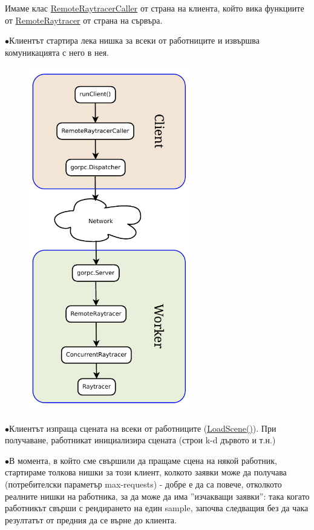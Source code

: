 \documentclass[12pt]{extarticle}
\newlength{\bulletwidth}\settowidth{\bulletwidth}{$\bullet$}
\newcommand{\mitem}{\vspace{5mm}\setlength{\leftskip}{\leftmargin}\hspace*{-\labelsep}\hspace*{-\bulletwidth}$\bullet$\hspace*{\labelsep}}
\begin{document}
Имаме клас \href{https://godoc.org/github.com/DexterLB/traytor/rpc#RemoteRaytracerCaller}{RemoteRaytracerCaller} от страна на клиента, който вика функциите от \href{https://godoc.org/github.com/DexterLB/traytor/rpc#RemoteRaytracer}{RemoteRaytracer} от страна на
сървъра.


	\mitem Клиентът стартира лека нишка за всеки от работниците
	и извършва комуникацията с него в нея.

\begin{figure}
\includegraphics[width=7cm]{architecture.pdf}
\end{figure}
	
	\mitem Клиентът изпраща сцената на всеки от работниците
	(\href{https://godoc.org/github.com/DexterLB/traytor/rpc#RemoteRaytracer.LoadScene}{LoadScene()}). При получаване,
	работникат инициализира сцената (строи k-d дървото и т.н.)
	
	\mitem В момента, в който сме свършили да пращаме сцена на някой
	работник, стартираме толкова нишки за този клиент, колкото заявки
	може да получава (потребителски параметър max-requests) - добре е 
	да са повече, отколкото реалните нишки на работника, за да може
	да има ''изчакващи заявки'': така когато работникът свърши с
	рендирането на един sample, започва следващия без да чака
	резултатът от предния да се върне до клиента.
	
\end{document}
